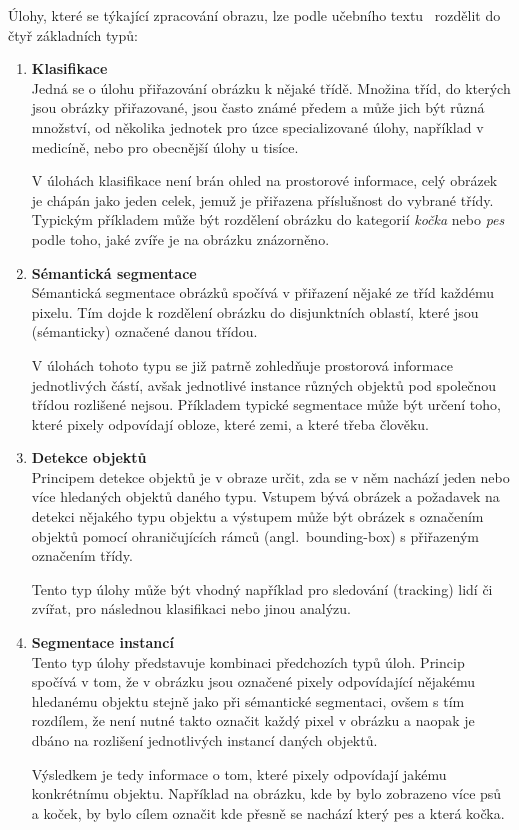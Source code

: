 Úlohy, které se týkající zpracování obrazu, lze podle učebního textu~\cite{conv-gruber} rozdělit do čtyř základních typů:
\begin{enumerate}
	\item \textbf{Klasifikace}\\
	      Jedná se o úlohu přiřazování obrázku k nějaké třídě.
	      Množina tříd, do kterých jsou obrázky přiřazované, jsou často známé předem a může jich být různá množství,
	      od několika jednotek pro úzce specializované úlohy, například v medicíně, nebo pro obecnější úlohy u tisíce.

	      V úlohách klasifikace není brán ohled na prostorové informace, celý obrázek je chápán jako jeden celek,
	      jemuž je přiřazena příslušnost do vybrané třídy.
	      Typickým příkladem může být rozdělení obrázku do kategorií \emph{kočka} nebo \emph{pes} podle toho,
	      jaké zvíře je na obrázku znázorněno.
	\item \textbf{Sémantická segmentace}\\
	      Sémantická segmentace obrázků spočívá v přiřazení nějaké ze tříd každému pixelu.
	      Tím dojde k rozdělení obrázku do disjunktních oblastí, které jsou (sémanticky) označené danou třídou.

	      V úlohách tohoto typu se již patrně zohledňuje prostorová informace jednotlivých částí,
	      avšak jednotlivé instance různých objektů pod společnou třídou rozlišené nejsou.
	      Příkladem typické segmentace může být určení toho, které pixely odpovídají obloze, které zemi, a které třeba člověku.

	      \newpage
	\item \textbf{Detekce objektů}\\
	      Principem detekce objektů je v obraze určit, zda se v něm nachází jeden nebo více hledaných objektů daného typu.
	      Vstupem bývá obrázek a požadavek na detekci nějakého typu objektu a výstupem může být obrázek s označením
	      objektů pomocí ohraničujících rámců (angl.~bounding-box) s přiřazeným označením třídy.

	      Tento typ úlohy může být vhodný například pro sledování (tracking) lidí či zvířat, pro následnou klasifikaci nebo jinou analýzu.

	\item \textbf{Segmentace instancí}\\
	      Tento typ úlohy představuje kombinaci předchozích typů úloh.
	      Princip spočívá v tom, že v obrázku jsou označené pixely odpovídající nějakému hledanému objektu stejně jako při
	      sémantické segmentaci, ovšem s tím rozdílem, že není nutné takto označit každý pixel v obrázku a naopak je
	      dbáno na rozlišení jednotlivých instancí daných objektů.

	      Výsledkem je tedy informace o tom, které pixely odpovídají jakému konkrétnímu objektu.
	      Například na obrázku, kde by bylo zobrazeno více psů a koček, by bylo cílem označit kde přesně se nachází
	      který pes a která kočka.
\end{enumerate}

